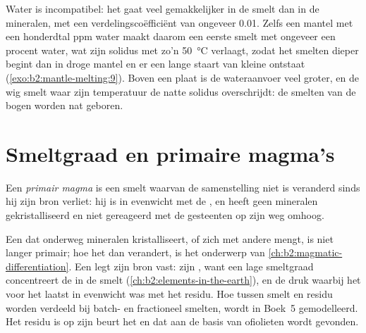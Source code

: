 Water is incompatibel: het gaat veel gemakkelijker in de smelt dan in de mineralen,
met een verdelingscoëfficiënt van ongeveer 0.01. Zelfs een mantel met een honderdtal
ppm water maakt daarom een eerste smelt met ongeveer een procent
water, wat zijn solidus met zo'n \qty{50}{\celsius} verlaagt, zodat het smelten
dieper begint dan in droge mantel en er een lange staart van kleine  ontstaat
(\cref{exo:b2:mantle-melting:9}). Boven een plaat is de wateraanvoer veel groter, en de wig smelt
waar zijn temperatuur de natte solidus overschrijdt: de smelten van de bogen worden
nat geboren.

\section{Smeltgraad en primaire magma's}\label{sec:b2:mantle-melting:primary}

\begin{definition}\label{def:b2:mantle-melting:primary}
Een \emph{primair magma} is een smelt waarvan de samenstelling niet
is veranderd sinds hij zijn bron verliet: hij is in evenwicht met de ,
en heeft geen mineralen gekristalliseerd en niet gereageerd met de gesteenten op zijn weg omhoog.
\end{definition}

Een  dat onderweg mineralen kristalliseert, of zich met andere mengt, is niet
langer primair; hoe het dan verandert, is het onderwerp van
\cref{ch:b2:magmatic-differentiation}. Een  legt zijn bron vast: zijn
, want een lage smeltgraad concentreert de 
in de smelt (\cref{ch:b2:elements-in-the-earth}), en de druk waarbij het voor het laatst
in evenwicht was met het residu. Hoe  tussen smelt en
residu worden verdeeld bij batch- en fractioneel smelten, wordt in Boek~5 gemodelleerd. Het
residu is op zijn beurt het  en  dat aan de basis van
ofiolieten wordt gevonden.

